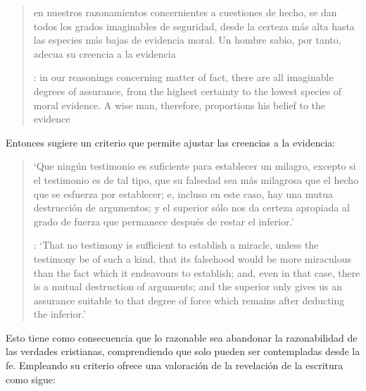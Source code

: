 \blockquote[{\cite[\S10,1. 73]{hume1777enquiry}}: in our reasonings concerning
matter of fact, there are all imaginable degrees of assurance, from the highest
certainty to the lowest species of moral evidence. A wise man, therefore,
proportions his belief to the evidence]{en nuestros razonamientos concernientes
  a cuestiones de hecho, se dan todos los grados imaginables de seguridad, desde la
  certeza más alta hasta las especies más bajas de evidencia moral. Un hombre
  sabio, por tanto, adecua su creencia a la evidencia}.

Entonces sugiere un criterio que permite ajustar las creencias
a la evidencia:

\blockquote[{\cite[\S10,1. 77]{hume1777enquiry}}: `That no testimony is
sufficient to establish a miracle, unless the testimony be of such a kind, that
its falsehood would be more miraculous than the fact which it endeavours to
establish; and, even in that case, there is a mutual destruction of arguments;
and the superior only gives us an assurance suitable to that degree of force
which remains after deducting the inferior.']{`Que ningún testimonio es
  suficiente para establecer un milagro, excepto si el testimonio es de tal
  tipo, que su falsedad sea más milagrosa que el hecho que se esfuerza por
  establecer; e, incluso en este caso, hay una mutua destrucción de argumentos;
  y el superior sólo nos da certeza apropiada al grado de fuerza que permanece
  después de restar el inferior.'}

Esto tiene como consecuencia que lo razonable sea abandonar la razonabilidad de
las verdades cristianas, comprendiendo que solo pueden ser contempladas desde la
fe. Empleando su criterio ofrece una valoración de la revelación de la escritura
como sigue:


